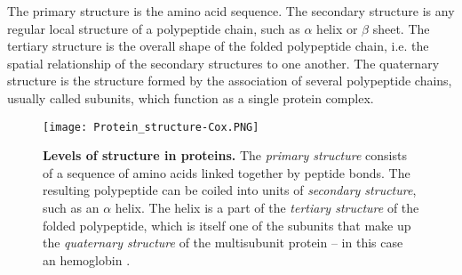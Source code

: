 The primary structure is the amino acid sequence. The secondary structure is any regular local structure of a polypeptide chain, such as $\alpha$ helix or $\beta$ sheet. 
The tertiary structure is the overall shape of the folded polypeptide chain, i.e. the spatial relationship of the secondary structures to one another.
The quaternary structure is the structure formed by the association of several polypeptide chains, usually called subunits, which function as a single protein complex.

\begin{figure}[h]
\centering
\begin{minipage}[t]{\textwidth}
\centering
\texttt{[image: Protein\_structure-Cox.PNG]}

\caption{\small{\textbf{Levels of structure in proteins.} The \textit{primary structure} consists of a sequence of amino acids linked together by peptide bonds. The resulting polypeptide can be coiled into units of \textit{secondary structure}, such as an $\alpha$ helix. The helix is a part of the \textit{tertiary structure} of the folded polypeptide, which is itself one of the subunits that make up the \textit{quaternary structure} of the multisubunit protein -- in this case an hemoglobin
\cite{nelson2008lehninger}.}}

\label{fig:ProteinStructure}
\end{minipage} 
\end{figure}



